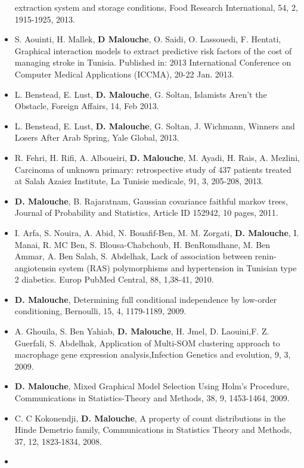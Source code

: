 \documentclass[]{article}
\begin{document}
\begin{itemize}
  extraction system and storage conditions, Food Research International,
  54, 2, 1915-1925, 2013.
\item
  S. Aouinti, H. Mallek, \textbf{D Malouche}, O. Saidi, O. Lassouedi, F.
  Hentati, Graphical interaction models to extract predictive risk
  factors of the cost of managing stroke in Tunisia. Published in: 2013
  International Conference on Computer Medical Applications (ICCMA),
  20-22 Jan. 2013.
\item
  L. Benstead, E. Lust, \textbf{D. Malouche}, G. Soltan, Islamists
  Aren't the Obstacle, Foreign Affairs, 14, Feb 2013.
\item
  L. Benstead, E. Lust, \textbf{D. Malouche}, G. Soltan, J. Wichmann,
  Winners and Losers After Arab Spring, Yale Global, 2013.
\item
  R. Fehri, H. Rifi, A. Alboueiri, \textbf{D. Malouche}, M. Ayadi, H.
  Rais, A. Mezlini, Carcinoma of unknown primary: retrospective study of
  437 patients treated at Salah Azaiez Institute, La Tunisie medicale,
  91, 3, 205-208, 2013.
\item
  \textbf{D. Malouche}, B. Rajaratnam, Gaussian covariance faithful
  markov trees, Journal of Probability and Statistics, Article ID
  152942, 10 pages, 2011.
\item
  I. Arfa, S. Nouira, A. Abid, N. Bouafif-Ben, M. M. Zorgati, \textbf{D.
  Malouche}, I. Manai, R. MC Ben, S. Blousa-Chabchoub, H. BenRomdhane,
  M. Ben Ammar, A. Ben Salah, S. Abdelhak, Lack of association between
  renin-angiotensin system (RAS) polymorphisms and hypertension in
  Tunisian type 2 diabetics. Europ PubMed Central, 88, 1,38-41, 2010.
\item
  \textbf{D. Malouche}, Determining full conditional independence by
  low-order conditioning, Bernoulli, 15, 4, 1179-1189, 2009.
\item
  A. Ghouila, S. Ben Yahiab, \textbf{D. Malouche}, H. Jmel, D.
  Laouini,F. Z. Guerfali, S. Abdelhak, Application of Multi-SOM
  clustering approach to macrophage gene expression analysis,Infection
  Genetics and evolution, 9, 3, 2009.
\item
  \textbf{D. Malouche}, Mixed Graphical Model Selection Using Holm's
  Procedure, Communications in Statistics-Theory and Methods, 38, 9,
  1453-1464, 2009.
\item
  C. C Kokonendji, \textbf{D. Malouche}, A property of count
  distributions in the Hinde Demetrio family, Communications in
  Statistics Theory and Methods, 37, 12, 1823-1834, 2008.
\item

\end{itemize}
\end{document}
